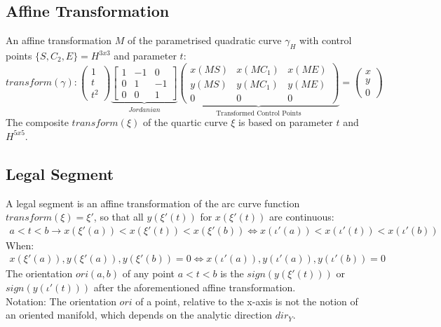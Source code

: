 \documentclass{report}
\begin{document}
\subsection{Affine Transformation}
An affine transformation $M$ of the parametrised quadratic curve $\gamma_{H}$ with control points $\{S,C_{2},E\} = H^{3x3}$ and parameter $t$:
\begin{equation}
transform(\gamma):
\begin{pmatrix}
1 \\
t \\
t^2
\end{pmatrix}
\underbrace{\begin{bmatrix}
1 & -1 & 0\\
0 & 1 & -1\\
0 & 0 &1
\end{bmatrix}}_{Jordanian}
\underbrace{\begin{pmatrix}
x(MS) & x(MC_{1}) & x(ME) \\
y(MS) & y(MC_{1}) & y(ME) \\
0 & 0 & 0
\end{pmatrix}}_{\text{Transformed Control Points}}
=
\begin{pmatrix}
x \\
y \\
0
\end{pmatrix}
\end{equation}
The composite $transform(\xi)$ of the quartic curve $\xi$ is based on parameter $t$ and $H^{5x5}$. ~\cite[Spline\_Axioms.tex]{Analyzer}

\subsection{Legal Segment}
A legal segment is an affine transformation of the arc curve function $transform(\xi) = \xi'$, so that all $y(\xi'(t))$ for $x(\xi'(t))$ are continuous:
\begin{align}
a<t<b\rightarrow x(\xi'(a))<x(\xi'(t))<x(\xi'(b)) \Leftrightarrow x(\iota'(a))<x(\iota'(t))<x(\iota'(b))
\end{align}
When:
\begin{align}
x(\xi'(a)),y(\xi'(a)), y(\xi'(b)) = 0 \Leftrightarrow x(\iota'(a)),y(\iota'(a)), y(\iota'(b)) = 0
\end{align}
The orientation $ori(a,b)$ of any point $a < t < b$ is the $sign(y(\xi'(t)))$ or $sign(y(\iota'(t)))$ after the aforementioned affine transformation.\\
Notation: The orientation $ori$ of a point, relative to the x-axis is not the notion of an oriented manifold, which depends on the analytic direction $dir_{Y}$.
\end{document}
